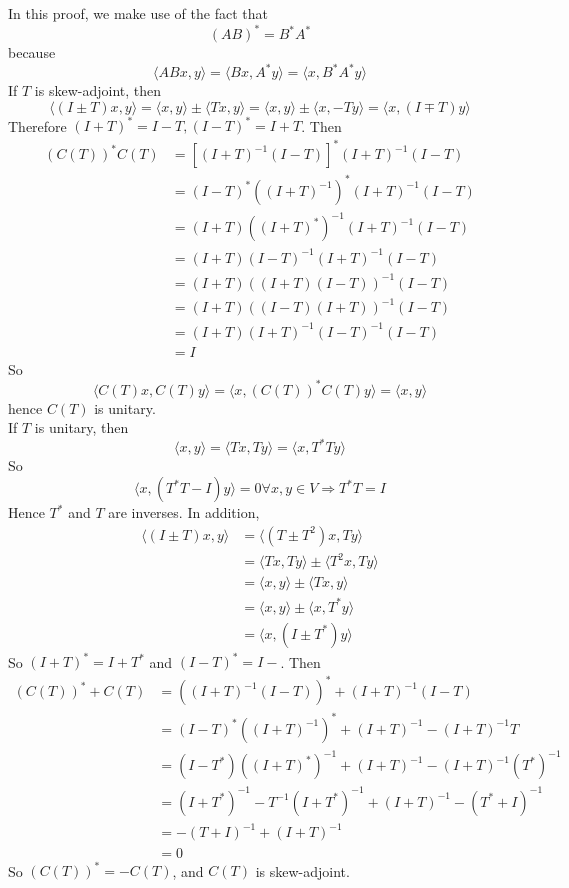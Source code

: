 \documentclass[answers]{exam}
\begin{document}
\begin{questions}
\begin{parts}
	\begin{solution}
		In this proof, we make use of the fact that
		$$(AB)^* = B^*A^*$$
		because
		$$\langle ABx,y \rangle = \langle Bx,A^*y \rangle = \langle x,B^*A^*y \rangle$$
		If $T$ is skew-adjoint, then
		$$\langle (I\pm T)x,y \rangle = \langle x,y \rangle \pm \langle Tx,y \rangle = \langle x,y \rangle \pm \langle x,-Ty \rangle = \langle x,(I \mp T)y \rangle$$
		Therefore $(I+T)^* = I-T, (I-T)^* = I+T$. Then
		\begin{align*}
			(C(T))^*C(T) &= [(I+T)^{-1}(I-T)]^*(I+T)^{-1}(I-T) \\
				     &= (I-T)^*\left((I+T)^{-1}\right)^*(I+T)^{-1}(I-T) \\
				     &= (I+T)\left((I+T)^*\right)^{-1}(I+T)^{-1}(I-T) \\
				     &= (I+T)(I-T)^{-1}(I+T)^{-1}(I-T) \\
				     &= (I+T)\left((I+T)(I-T)\right)^{-1}(I-T) \\
				     &= (I+T)\left((I-T)(I+T)\right)^{-1}(I-T) \\
				     &= (I+T)(I+T)^{-1}(I-T)^{-1}(I-T) \\
				     &= I
		\end{align*}
		So
		$$\langle C(T)x,C(T)y \rangle = \langle x,(C(T))^*C(T)y \rangle = \langle x,y \rangle$$
		hence $C(T)$ is unitary. \\
		If $T$ is unitary, then
		$$\langle x,y \rangle = \langle Tx,Ty \rangle = \langle x,T^*Ty \rangle$$
		So
		$$\langle x,(T^*T-I)y \rangle = 0 \forall x,y \in V \Rightarrow T^*T = I$$
		Hence $T^*$ and $T$ are inverses. In addition,
		\begin{align*}
			\langle (I \pm T)x,y \rangle &= \langle (T \pm T^2)x, Ty \rangle \\
						     &= \langle Tx,Ty \rangle \pm \langle T^2x,Ty \rangle \\
						     &= \langle x,y \rangle \pm \langle Tx,y \rangle \\
						     &= \langle x,y \rangle \pm \langle x,T^*y \rangle \\
						     &= \langle x, (I \pm T^*)y \rangle
		\end{align*}
		So $(I+T)^* = I+T^*$ and $(I-T)^* = I-$. Then
		\begin{align*}
			(C(T))^* + C(T) &= \left((I+T)^{-1}(I-T)\right)^* + (I+T)^{-1}(I-T) \\
					&= (I-T)^*\left((I+T)^{-1}\right)^* + (I+T)^{-1} - (I+T)^{-1}T \\
					&= (I-T^*)\left((I+T)^*\right)^{-1} + (I+T)^{-1} - (I+T)^{-1}(T^*)^{-1} \\
					&= (I+T^*)^{-1} - T^{-1}(I+T^*)^{-1} + (I+T)^{-1} - (T^*+I)^{-1} \\
					&= -(T+I)^{-1} + (I+T)^{-1} \\
					&= 0
		\end{align*}
		So $(C(T))^* = -C(T)$, and $C(T)$ is skew-adjoint.
	\end{solution}


\end{parts}
\end{questions}
\end{document}

